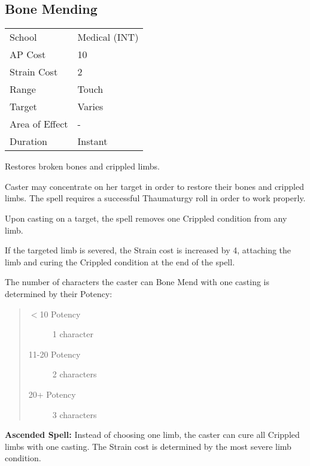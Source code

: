\documentclass[11pt,a4paper,twocolumn]{book}
\begin{document}

\subsection*{Bone Mending}
{
	\begin{tabu} to 75mm{| X[l,4] | X[l,7] |}
		\hline
		School 			& Medical (INT) 		\\
		AP Cost	      	& 10 					\\
		Strain Cost     & 2 					\\
		Range     		& Touch 				\\
		Target      	& Varies 					\\
		Area of Effect  & - 	 				\\
		Duration     	& Instant 			\\ \hline
	\end{tabu}
	
}

\medskip

Restores broken bones and crippled limbs.

Caster may concentrate on her target in order to restore their bones and crippled limbs. The spell requires a successful Thaumaturgy roll in order to work properly.

Upon casting on a target, the spell removes one Crippled condition from any limb.

If the targeted limb is severed, the Strain cost is increased by 4, attaching the limb and curing the Crippled condition at the end of the spell.

The number of characters the caster can Bone Mend with one casting is determined by their Potency:

\begin{quote}
	\begin{description}
		\item[$<$10 Potency] 	1 character
		\item[11-20 Potency] 	2 characters
		\item[20+ Potency] 	    3 characters
	\end{description}	
\end{quote}

\bigskip

\textbf{Ascended Spell:} Instead of choosing one limb, the caster can cure all Crippled limbs with one casting. The Strain cost is determined by the most severe limb condition.
\end{document}
